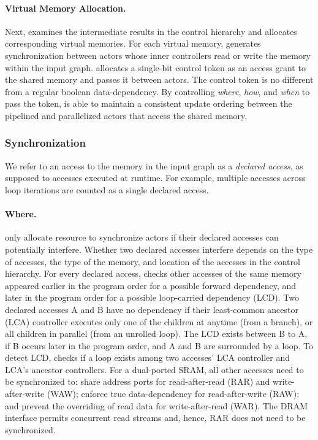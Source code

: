 \paragraph{Virtual Memory Allocation.}
Next, \name{} examines the intermediate results in the control hierarchy and allocates corresponding virtual memories.
For each virtual memory, \name{} generates synchronization between actors whose inner controllers read or write the memory within the input graph.
\name{} allocates a single-bit control token as an access grant to the shared memory and passes it between actors. 
The control token is no different from a regular boolean data-dependency.
By controlling {\em where}, {\em how}, and {\em when} to pass the token, \name{} is able to maintain a consistent update ordering between the pipelined and parallelized actors that access the shared memory.

\subsubsection{Synchronization} 
\label{sec:sync}
We refer to an access to the memory in the input graph as a \emph{declared access}, as supposed to accesses executed at runtime.
For example, multiple accesses across loop iterations are counted as a single declared access.

\paragraph{Where.}
\name only allocate resource to synchronize actors if their declared accesses can potentially interfere.
Whether two declared accesses interfere depends on the type of accesses, the type of the memory, and location of the accesses in the control hierarchy.
For every declared access, \name{} checks other accesses of the same memory appeared earlier in the program order for a possible forward dependency, and later in the program order for a possible loop-carried dependency (LCD). 
Two declared accesses A and B have no dependency if their least-common ancestor (LCA) controller executes only one of the children at anytime (from a branch), or all children in parallel (from an unrolled loop).
The LCD exists between B to A, if B occurs later in the program order, and A and B are surrounded by a loop.
To detect LCD, \name checks if a loop exists among two accesses' LCA controller and LCA's ancestor controllers.
For a dual-ported SRAM, all other accesses need to be synchronized to: share address ports for read-after-read (RAR) and write-after-write (WAW); 
enforce true data-dependency for read-after-write (RAW); and
prevent the overriding of read data for write-after-read (WAR).
The DRAM interface permits concurrent read streams and, hence, RAR does not need to be synchronized.

